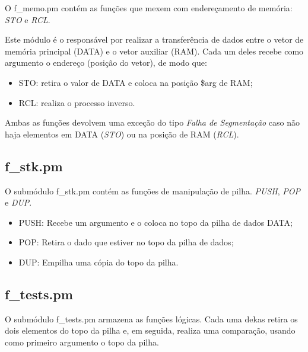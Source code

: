 \documentclass[a4paper]{article}
\begin{document}
        O f\_memo.pm  contém as funções que mexem com endereçamento
        de memória: \emph{STO} e \emph{RCL}.
        
        Este módulo é o responsável por realizar a transferência de
        dados entre o vetor de memória principal (DATA) e o vetor 
        auxiliar (RAM). Cada um deles recebe como argumento o endereço
        (posição do vetor), de modo que:
        \begin{itemize}
            
            \item STO: retira o valor de DATA e coloca na posição 
                       \$arg de RAM;
            \item RCL: realiza o processo inverso.
            
        \end{itemize}
        
        Ambas as funções devolvem uma exceção do tipo \emph{Falha de
        Segmentação} caso não haja elementos em DATA (\emph{STO}) ou 
        na posição de RAM (\emph{RCL}).
        
    \subsection{f\_stk.pm}
        
        O submódulo f\_stk.pm contém as funções de manipulação de pilha.
        \emph{PUSH}, \emph{POP} e \emph{DUP}.
        \begin{itemize}
            
            \item PUSH: Recebe um argumento e o coloca no topo da pilha 
                        de dados DATA;
            
            \item POP:  Retira o dado que estiver no topo da pilha de 
                        dados; 
            
            \item DUP:  Empilha uma cópia do topo da pilha.
        
        \end{itemize}
        
    \subsection{f\_tests.pm}
            
        O submódulo f\_tests.pm armazena as funções lógicas. Cada uma
        dekas retira os dois elementos do topo da pilha e, em seguida,
        realiza uma comparação, usando como primeiro argumento o topo
        da pilha.
        
\end{document}
